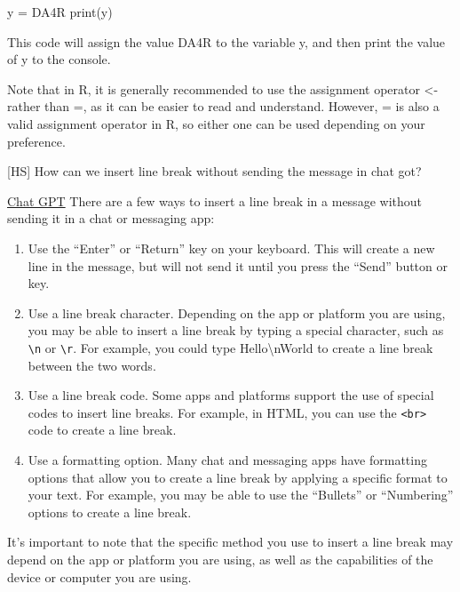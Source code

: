 \documentclass[
]{bxjsbook}
\newenvironment{Shaded}{\begin{snugshade}}{\end{snugshade}}
\newcommand{\FunctionTok}[1]{\textcolor[rgb]{0.00,0.00,0.00}{#1}}
\newcommand{\NormalTok}[1]{#1}
\newcommand{\OtherTok}[1]{\textcolor[rgb]{0.56,0.35,0.01}{#1}}
\providecommand{\tightlist}{%
  \setlength{\itemsep}{0pt}\setlength{\parskip}{0pt}}
\theoremstyle{definition}
\theoremstyle{definition}
\theoremstyle{definition}
\theoremstyle{definition}
\theoremstyle{remark}
\begin{document}
\begin{Shaded}
\begin{Highlighting}[]
\NormalTok{y }\OtherTok{=}\NormalTok{ DA4R}
\FunctionTok{print}\NormalTok{(y)}
\end{Highlighting}
\end{Shaded}

This code will assign the value DA4R to the variable y, and then print the value of y to the console.

Note that in R, it is generally recommended to use the assignment operator \textless- rather than =, as it can be easier to read and understand. However, = is also a valid assignment operator in R, so either one can be used depending on your preference.

{[}HS{]} How can we insert line break without sending the message in chat got?

\protect\hyperlink{chatgpt}{Chat GPT} There are a few ways to insert a line break in a message without sending it in a chat or messaging app:

\begin{enumerate}
\def\labelenumi{\arabic{enumi}.}
\tightlist
\item
  Use the ``Enter'' or ``Return'' key on your keyboard. This will create a new line in the message, but will not send it until you press the ``Send'' button or key.
\item
  Use a line break character. Depending on the app or platform you are using, you may be able to insert a line break by typing a special character, such as \texttt{\textbackslash{}n} or \texttt{\textbackslash{}r}. For example, you could type Hello\textbackslash nWorld to create a line break between the two words.
\item
  Use a line break code. Some apps and platforms support the use of special codes to insert line breaks. For example, in HTML, you can use the \texttt{\textless{}br\textgreater{}} code to create a line break.
\item
  Use a formatting option. Many chat and messaging apps have formatting options that allow you to create a line break by applying a specific format to your text. For example, you may be able to use the ``Bullets'' or ``Numbering'' options to create a line break.
\end{enumerate}

It's important to note that the specific method you use to insert a line break may depend on the app or platform you are using, as well as the capabilities of the device or computer you are using.
\end{document}
